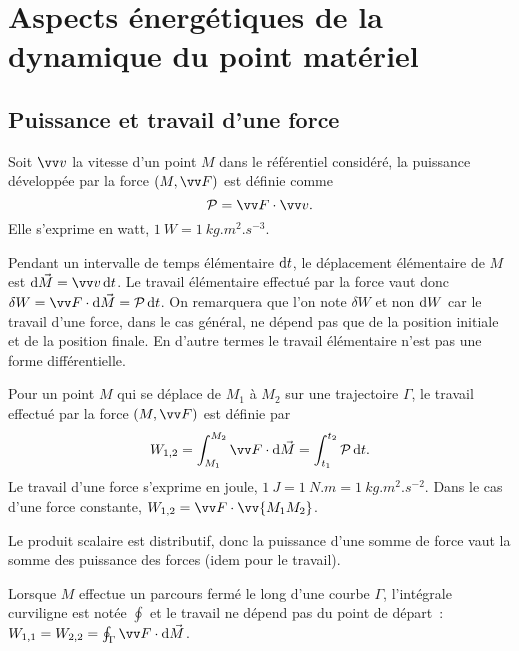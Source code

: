 \chapter{Aspects énergétiques de la dynamique du point matériel}%
\label{chap:aspectenergetiques}%
\minitoc{}
\minilof{}
\minilot{}

\section{Puissance et travail d'une force}%
\label{chap4-sec:puissanceettravail}%
\begin{defdef}[Puissance]%
  Soit \(\vvv\) la vitesse d'un point \(M\) dans le référentiel considéré, la 
  puissance développée par la force \((M, \vF)\) est définie comme
  \begin{equation}
    \P=\vF \cdot \vvv.
  \end{equation}
  Elle s'exprime en watt, \(\SI{1}{W}=\SI{1}{kg.m^2.s^{-3}}\).
\end{defdef}%
 Pendant un intervalle de temps élémentaire \(\mathop{}\mathopen{}\mathrm{d} t\), le déplacement 
 élémentaire de \(M\) est \(\diff \vec{M} = \vvv \diff t\). Le travail 
 élémentaire effectué par la force vaut donc \(\delta W = \vF \cdot \diff 
 \vec{M} = \P \diff t\). On remarquera que l'on note \(\delta W\) et non 
 \(\mathop{}\mathopen{}\mathrm{d} W\) car le travail d'une force, dans le cas général, ne dépend pas que 
 de la position initiale et de la position finale. En d'autre termes le travail 
 élémentaire n'est pas une forme différentielle.
\begin{defdef}[Travail]%
  Pour un point \(M\) qui se déplace de \(M_1\) à \(M_2\) sur une trajectoire 
  \(\Gamma\), le travail effectué par la force \((M, \vF)\) est définie par
\begin{equation}%
  W_{1, 2} = \int_{M_1}^{M_2} \vF \cdot \diff \vec{M} = \int_{t_1}^{t_2} \P 
  \diff t.
\end{equation}%
Le travail d'une force s'exprime en joule, 
  \(\SI{1}{J}=\SI{1}{N.m}=\SI{1}{kg.m^2.s^{-2}}\). Dans le cas d'une force 
  constante, \(W_{1, 2}=\vF \cdot \vv{M_1M_2}\).
\end{defdef}%
 Le produit scalaire est distributif, donc la puissance d'une somme de force 
 vaut la somme des puissance des forces (idem pour le travail).

Lorsque \(M\) effectue un parcours fermé le long d'une courbe \(\Gamma\), 
l'intégrale curviligne est notée \(\oint\) et le travail ne dépend pas du point 
de départ~: \(W_{1,1} = W_{2,2} = \oint_\Gamma \vF \cdot \diff \vec{M}\).

